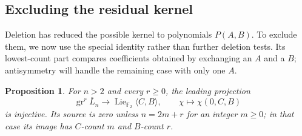 \documentclass[11pt]{article}
\newcommand{\F}{{\mathbb F_2}}
\newcommand{\Lie}{\operatorname{Lie}}
\newtheorem{proposition}[theorem]{Proposition}
\theoremstyle{definition}
\theoremstyle{remark}
\numberwithin{equation}{section}
\begin{document}
\subsection{Excluding the residual kernel}
Deletion has reduced the possible kernel to polynomials $P(A,B)$.
To exclude them, we now use the special identity rather than further
deletion tests.  Its lowest-count part compares coefficients obtained
by exchanging an $A$ and a $B$; antisymmetry will handle the remaining
case with only one $A$.

\begin{proposition}\label{prop:projection-injective}
For $n>2$ and every $r\geq0$, the leading projection
\[
 \operatorname{gr}^{r}\overline L_n\longrightarrow
 \Lie_{\F}\langle C,B\rangle,\qquad
 \chi\longmapsto\chi(0,C,B)
\]
is injective.  Its source is zero unless $n=2m+r$ for an integer
$m\geq0$; in that case its image has $C$-count $m$ and $B$-count $r$.
\end{proposition}
\end{document}
